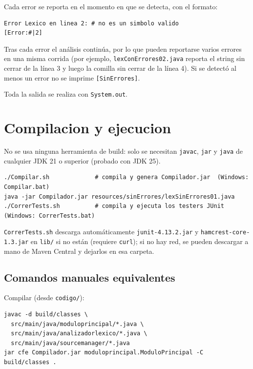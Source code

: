 \documentclass[11pt,a4paper]{article}
\begin{document}
Cada error se reporta en el momento en que se detecta, con el formato:

\begin{verbatim}
Error Lexico en linea 2: # no es un simbolo valido
[Error:#|2]
\end{verbatim}

Tras cada error el análisis continúa, por lo que pueden reportarse varios errores en una
misma corrida (por ejemplo, \texttt{lexConErrores02.java} reporta el string sin cerrar de la
línea 3 y luego la comilla sin cerrar de la línea 4). Si se detectó al menos un error no se
imprime \texttt{[SinErrores]}.

Toda la salida se realiza con \texttt{System.out}.

\section{Compilacion y ejecucion}

No se usa ninguna herramienta de build: solo se necesitan \texttt{javac}, \texttt{jar} y
\texttt{java} de cualquier JDK 21 o superior (probado con JDK 25).

{\footnotesize
\begin{verbatim}
./Compilar.sh             # compila y genera Compilador.jar  (Windows: Compilar.bat)
java -jar Compilador.jar resources/sinErrores/lexSinErrores01.java
./CorrerTests.sh          # compila y ejecuta los testers JUnit  (Windows: CorrerTests.bat)
\end{verbatim}
}

\texttt{CorrerTests.sh} descarga automáticamente \texttt{junit-4.13.2.jar} y
\texttt{hamcrest-core-1.3.jar} en \texttt{lib/} si no están (requiere \texttt{curl});
si no hay red, se pueden descargar a mano de Maven Central y dejarlos en esa carpeta.

\subsection{Comandos manuales equivalentes}

Compilar (desde \texttt{codigo/}):

{\footnotesize
\begin{verbatim}
javac -d build/classes \
  src/main/java/moduloprincipal/*.java \
  src/main/java/analizadorlexico/*.java \
  src/main/java/sourcemanager/*.java
jar cfe Compilador.jar moduloprincipal.ModuloPrincipal -C build/classes .
\end{verbatim}
}
\end{document}
